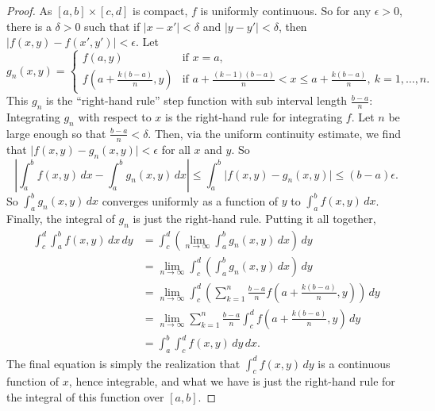 \documentclass[12pt,openany]{book}
\newcommand{\sabs}[1]{\lvert {#1} \rvert}
\newcommand{\babs}[1]{\bigl\lvert {#1} \bigr\rvert}
\newcommand{\abs}[1]{\left\lvert {#1} \right\rvert}
\newcommand{\myquote}[1]{``#1''}
\theoremstyle{plain}
\theoremstyle{remark}
\theoremstyle{definition}
\theoremstyle{exercise}
\theoremstyle{example}
\begin{document}
\begin{proof}
As $[a,b] \times [c,d]$ is compact, $f$ is uniformly continuous.
So for
any $\epsilon > 0$, there is a $\delta > 0$ such that if
$\sabs{x-x'} < \delta$ and 
$\sabs{y-y'} < \delta$, then $\sabs{f(x,y) -f(x',y')} < \epsilon$.
Let
\begin{equation*}
g_n(x,y)
=
\begin{cases}
f(a,y) & \text{if } x=a ,
\\
f\left(a+\frac{k(b-a)}{n},y\right)
& \text{if } a+\frac{(k-1)(b-a)}{n} < x \leq a+\frac{k(b-a)}{n} , ~
k=1,\ldots,n.
\end{cases}
\end{equation*}
This $g_n$ is the \myquote{right-hand rule} step function with sub
interval length $\frac{b-a}{n}$:
Integrating $g_n$ with respect to $x$ is the right-hand rule for integrating $f$.
Let $n$ be large enough so that $\frac{b-a}{n} < \delta$.  Then,
via the uniform continuity estimate, we find that $\babs{f(x,y)-g_n(x,y)} < \epsilon$
for all $x$ and $y$. So
\begin{equation*}
\abs{
\int_a^b
f(x,y)
\, dx
-
\int_a^b
g_n(x,y)
\, dx
}
\leq
\int_a^b
\babs{
f(x,y)
-
g_n(x,y)
}
\leq (b-a)\epsilon .
\end{equation*}
So $\int_a^b g_n(x,y) \, dx$ converges uniformly as a function of $y$ to
$\int_a^b f(x,y) \, dx$.  Finally, the integral of $g_n$ is just the
right-hand rule.  Putting it all together,
\begin{equation*}
\begin{split}
\int_c^d \int_a^b f(x,y) \, dx \, dy
& =
\int_c^d
\left(
\lim_{n \to \infty}
\int_a^b g_n(x,y) \, dx
\right) \, dy
\\
& =
\lim_{n \to \infty}
\int_c^d
\left(
\int_a^b g_n(x,y) \, dx
\right) \, dy
\\
& =
\lim_{n \to \infty}
\int_c^d
\left(
\sum_{k=1}^n
\frac{b-a}{n} f\left(a+\frac{k(b-a)}{n},y\right)
\right) \, dy
\\
& =
\lim_{n \to \infty}
\sum_{k=1}^n
\frac{b-a}{n} 
\int_c^d
f\left(a+\frac{k(b-a)}{n},y\right)
\, dy
\\
& =
\int_a^b
\int_c^d
f(x,y)
\, dy \, dx .
\end{split}
\end{equation*}
The final equation is simply the realization that  
$\int_c^d
f(x,y)
\, dy$ is a continuous function of $x$, hence integrable, and what we have
is just the right-hand rule for the integral of this function over $[a,b]$.
\end{proof}
\end{document}
